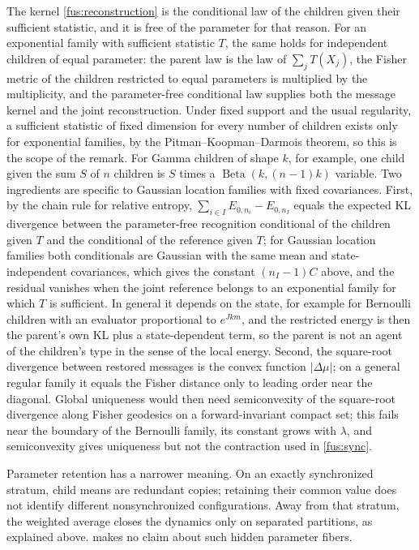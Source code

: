 The kernel \cref{fus:reconstruction} is the conditional law of the
children given their sufficient statistic, and it is free of the parameter
for that reason. For an exponential family with sufficient statistic $T$,
the same holds for independent children of equal parameter: the parent law
is the law of $\sum_jT(X_j)$, the Fisher metric of the children restricted to
equal parameters is multiplied by the multiplicity, and the parameter-free
conditional law supplies both the message kernel and the joint
reconstruction. Under fixed support and the usual regularity, a sufficient
statistic of fixed dimension for every number of children exists only for
exponential families, by the Pitman--Koopman--Darmois theorem, so this is the
scope of the remark. For Gamma children of shape $k$, for example, one child
given the sum $S$ of $n$ children is $S$ times a
$\operatorname{Beta}(k,(n-1)k)$ variable. Two ingredients are specific to
Gaussian location families with fixed covariances. First, by the chain rule
for relative entropy, $\sum_{i\in I}E_{0,n_i}-E_{0,n_I}$ equals the expected
KL divergence between the parameter-free recognition conditional of the
children given $T$ and the conditional of the reference given $T$; for
Gaussian location families both conditionals are Gaussian with the same
mean and state-independent covariances, which gives the constant $(n_I-1)C$
above, and the residual vanishes when the joint reference belongs to an
exponential family for which $T$ is sufficient. In general it depends on the
state, for example for Bernoulli children with an evaluator proportional to
$e^{Jkm}$, and the restricted energy is then the parent's own KL plus a
state-dependent term, so the parent is not an agent of the children's type
in the sense of the local energy. Second, the square-root divergence between
restored messages is the convex function $|\Delta\mu|$; on a general regular
family it equals the Fisher distance only to leading order near the
diagonal. Global uniqueness would then need semiconvexity of the square-root
divergence along Fisher geodesics on a forward-invariant compact set; this
fails near the boundary of the Bernoulli family, its constant grows with
$\lambda$, and semiconvexity gives uniqueness but not the contraction used in
\cref{fus:sync}.

Parameter retention has a narrower meaning. On an exactly synchronized
stratum, child means are redundant copies; retaining their common value
does not identify different nonsynchronized configurations. Away from that
stratum, the weighted average closes the dynamics only on separated
partitions, as explained above.  makes no claim about
such hidden parameter fibers.

